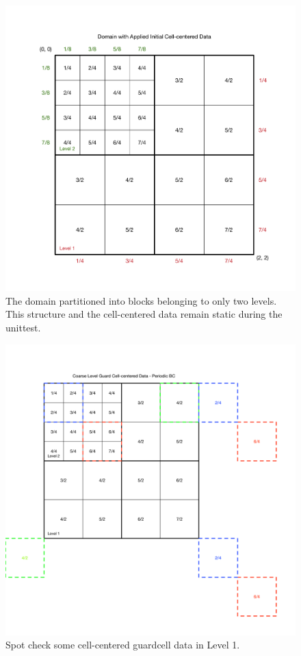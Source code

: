 \documentclass[12pt,letterpaper]{article}
\begin{document}
\setlength{\parindent}{0pt}

\begin{figure}[!hp]
\begin{center}
\includegraphics[width=6.5in]{TestGcFill_Domain.pdf}
\caption{The domain partitioned into blocks belonging to only two levels.  This
structure and the cell-centered data remain static during the unittest.}
\end{center}
\end{figure}

\newpage
\begin{figure}[!hp]
\begin{center}
\includegraphics[width=6.5in]{TestGcFill_CoarseGC.pdf}
\caption{Spot check some cell-centered guardcell data in Level 1.}
\end{center}
\end{figure}
\end{document}
